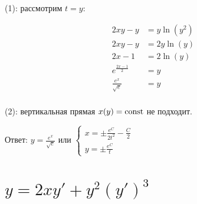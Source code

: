 (1): рассмотрим $t = y$:

\begin{align*}
    2xy-y               & = y\ln (y^2)        \\
    2xy-y               & = 2y\ln (y) \tag{2} \\
    2x-1                & = 2\ln (y)          \\
    e^\frac{2x-1}{2}    & = y                 \\
    \frac{e^x}{\sqrt e} & = y                 \\
\end{align*}

(2): вертикальная прямая $x(y) = \text{const}$ не подходит.

Ответ: $y = \frac{e^x}{\sqrt e}$ или $\begin{cases}
        x = \pm\frac{e^C}{2t^2} - \frac{C}{2} \\
        y = \pm\frac{e^C}{t}
    \end{cases}$

\section{$y=2xy'+y^2(y')^3$}

